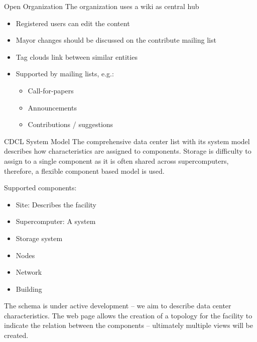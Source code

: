 \documentclass[portrait,a0paper,fontscale=0.4]{baposter}
\newcommand{\compresslist}{%
\setlength{\itemsep}{1pt}%
\setlength{\parskip}{0pt}%
\setlength{\parsep}{0pt}%
}
\begin{document}
\begin{poster}
\begin{posterbox}[name=overview,column=0,below=approach]{Open Organization}
The organization uses a wiki as central hub
\vspace*{-1em}
\begin{itemize}\compresslist
\item Registered users can edit the content
\item Mayor changes should be discussed on the contribute mailing list
\item Tag clouds link between similar entities
\item Supported by mailing lists, e.g.:
\begin{itemize}\compresslist
\item Call-for-papers
\item Announcements
\item Contributions / suggestions
\end{itemize}
\end{itemize}

\end{posterbox}


\begin{posterbox}[name=wps,column=0,below=overview]{CDCL System Model}
The comprehensive data center list with its system model describes how characteristics are assigned to components.
Storage is difficulty to assign to a single component as it is often shared across supercomputers,
therefore, a flexible component based model is used.

Supported components:
\vspace*{-1em}
\begin{itemize}\compresslist
\item Site: Describes the facility
\item Supercomputer: A system
\item Storage system
\item Nodes
\item Network
\item Building
\end{itemize}

\vspace*{-1em}

The schema is under active development -- we aim to describe data center characteristics.
The web page allows the creation of a topology for the facility to indicate the relation between the components -- ultimately multiple views will be created.
\end{posterbox}


\end{poster}
\end{document}
